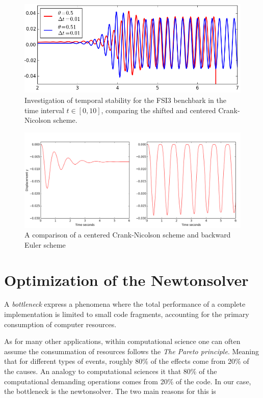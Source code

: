 \begin{figure}[h!]
 	\centering
    \includegraphics[scale=0.6]{./Fig/besttheta.png}
      \caption{Investigation of temporal stability for the FSI3 benchbark in the time interval $t \in [0, 10]$,  comparing the shifted and centered Crank-Nicolson scheme. }
\label{fig:cncomp2}
\end{figure}

\newpage

\begin{figure}[h!]
 	\centering
    \includegraphics[scale=0.4]{./Fig/thetacompare.png}
      \caption{A comparison of a centered Crank-Nicolson scheme and backward Euler scheme}
\label{fig:csm1scm3}
\end{figure}


\newpage
\section{Optimization of the Newtonsolver}
\label{sec:opti}
A \textit{bottleneck} express a phenomena where the total performance of a complete implementation is limited to small code fragments, accounting for the primary consumption of computer resources.

As for many other applications, within computational science one can often assume the consummation of resources follows the \textit{The Pareto principle}. Meaning that for different types of events, roughly 80\% of the effects come from 20\% of the causes. An analogy to computational sciences it that 80\% of the computational demanding operations comes from 20\% of the code. In our case, the bottleneck is the newtonsolver. The two main reasons for this is 

